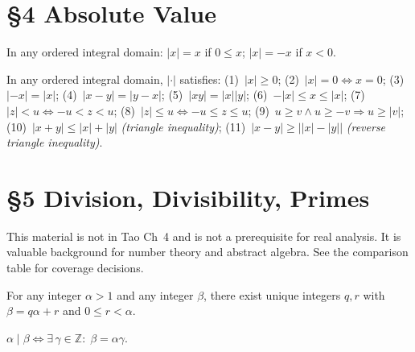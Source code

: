 \section*{§4 \quad Absolute Value}

\begin{tcolorbox}[colback=corbox, colframe=corborder, arc=2pt,
  left=6pt, right=6pt, top=4pt, bottom=4pt,
  title={\small\textbf{Definition 4.6 (Absolute value)}},
  fonttitle=\small\bfseries]
In any ordered integral domain:
$|x| = x$ if $0\leq x$; $|x|=-x$ if $x<0$.
\end{tcolorbox}

\begin{theorem}
\label{thm:men-absolute-value-properties}
In any ordered integral domain, $|{\cdot}|$ satisfies:
(1)~$|x|\geq 0$;
(2)~$|x|=0\iff x=0$;
(3)~$|-x|=|x|$;
(4)~$|x-y|=|y-x|$;
(5)~$|xy|=|x||y|$;
(6)~$-|x|\leq x\leq|x|$;
(7)~$|z|<u\iff -u<z<u$;
(8)~$|z|\leq u\iff -u\leq z\leq u$;
(9)~$u\geq v \wedge u\geq -v \Rightarrow u\geq|v|$;
(10)~$|x+y|\leq|x|+|y|$ \textit{(triangle inequality)};
(11)~$|x-y|\geq\bigl||x|-|y|\bigr|$ \textit{(reverse triangle inequality)}.
\end{theorem}

\section*{§5 \quad Division, Divisibility, Primes}

\begin{remark}[Scope]
This material is not in Tao Ch~4 and is not a prerequisite for real
analysis.  It is valuable background for number theory and abstract algebra.
See the comparison table for coverage decisions.
\end{remark}

\begin{theorem}
\label{thm:men-euclidean-division}
For any integer $\alpha>1$ and any integer $\beta$, there exist unique
integers $q,r$ with $\beta=q\alpha+r$ and $0\leq r<\alpha$.
\end{theorem}

\begin{definition}[Divisibility]
$\alpha\mid\beta \iff \exists\,\gamma\in\mathbb{Z}:\;\beta=\alpha\gamma$.
\end{definition}

